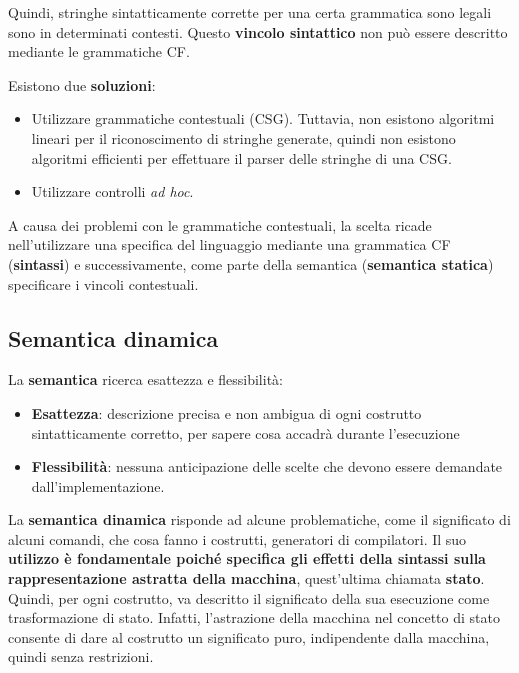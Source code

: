 \documentclass[a4paper]{article}
\begin{document}
	\noindent
	Quindi, stringhe sintatticamente corrette per una certa grammatica sono legali sono in determinati contesti. Questo \textbf{vincolo sintattico} non può essere descritto mediante le grammatiche CF.\newline

	\noindent
	Esistono due \textbf{soluzioni}:
	\begin{itemize}
		\item Utilizzare grammatiche contestuali (CSG). Tuttavia, non esistono algoritmi lineari per il riconoscimento di stringhe generate, quindi non esistono algoritmi efficienti per effettuare il parser delle stringhe di una CSG.
		\item Utilizzare controlli \emph{ad hoc}.
	\end{itemize}
	A causa dei problemi con le grammatiche contestuali, la scelta ricade nell'utilizzare una specifica del linguaggio mediante una grammatica CF (\textbf{sintassi}) e successivamente, come parte della semantica (\textcolor{Red3}{\textbf{semantica statica}}) specificare i vincoli contestuali.\newpage

	\subsection{Semantica dinamica}

	La \textbf{semantica} ricerca esattezza e flessibilità:
	\begin{itemize}
		\item \textbf{Esattezza}: descrizione precisa e non ambigua di ogni costrutto sintatticamente corretto, per sapere cosa accadrà durante l'esecuzione
		\item \textbf{Flessibilità}: nessuna anticipazione delle scelte che devono essere demandate dall'implementazione.
	\end{itemize}
	La \textcolor{Red3}{\textbf{semantica dinamica}} risponde ad alcune problematiche, come il significato di alcuni comandi, che cosa fanno i costrutti, generatori di compilatori. Il suo \textbf{utilizzo è fondamentale poiché specifica gli effetti della sintassi sulla rappresentazione astratta della macchina}, quest'ultima chiamata \textbf{stato}.\newline
	Quindi, per ogni costrutto, va descritto il significato della sua esecuzione come trasformazione di stato. Infatti, l'astrazione della macchina nel concetto di stato consente di dare al costrutto un significato puro, indipendente dalla macchina, quindi senza restrizioni.\newline
\end{document}
